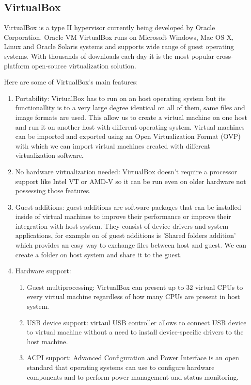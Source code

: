 \begin{itemize}
\section{VirtualBox}
VirtualBox is a type II hypervisor currently being developed by Oracle Corporation. Oracle VM VirtualBox runs on Microsoft Windows, Mac OS X, Linux and Oracle Solaris systems and supports wide range of guest operating systems. With thousands of downloads each day it is the most popular cross-platform open-source virtualization solution.

Here are some of VirtualBox's main features:
\begin{enumerate}
\item Portability: VirtualBox has to run on an host operating system but its functionallity is to a very large degree identical on all of them, same files and image formats are used. This allow us to create a virtual machine on one host and run it on another host with different operating system. Virtual machines can be imported and exported using an Open Virtualization Format (OVP) with which we can import virtual machines created with different virtualization software.
\item No hardware virtualization needed: VirtualBox doesn't require a processor support like Intel VT or AMD-V so it can be run even on older hardware not possessing those features.
\item Guest additions: guest additions are software packages that can be installed inside of virtual machines to improve their performance or improve their integration with host system. They consist of device drivers and system applications, for example on of guest additions is 'Shared folders addition' which provides an easy way to exchange files between host and guest. We can create a folder on host system and share it to the guest.
\item Hardware support:
\begin{enumerate}
\item Guest multiprocessing: VirtualBox can present up to 32 virtual CPUs to every virtual machine regardless of how many CPUs are present in host system.
\item USB device support: virtaul USB controller allows to connect USB device to virtual machine without a need to install device-specific drivers to the host machine.
\item ACPI support: Advanced Configuration and Power Interface is an open standard that operating systems can use to configure hardware components and to perform power management and status monitoring.

\end{enumerate}
\end{enumerate}
\end{itemize}
